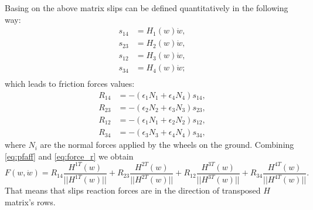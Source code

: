 Basing on the above matrix slips can be defined quantitatively in the following way: 
\begin{align*}
s_{14} &= H_1(w)\dot w,\\
s_{23} &= H_2(w)\dot w,\\
s_{12} &= H_3(w)\dot w,\\
s_{34} &= H_4(w)\dot w;\\
\end{align*}
which leads to friction forces values:
\begin{align}
\label{eq:force_r}
R_{14}&=-(\epsilon_1 N_1 + \epsilon_4 N_4)s_{14},\\
R_{23}&=-(\epsilon_2 N_2 + \epsilon_3 N_3)s_{23},\\
R_{12}&=-(\epsilon_1 N_1 + \epsilon_2 N_2)s_{12},\\
R_{34}&=-(\epsilon_3 N_3 + \epsilon_4 N_4)s_{34},
\end{align}
where $N_i$ are the normal forces applied by the wheels on the ground.
Combining \eqref{eq:pfaff} and \eqref{eq:force_r} we obtain
\begin{equation*}
F(w, \dot{w}) = R_{14}\frac{H^{1T}(w)}{||H^{1T}(w)||} + R_{23}\frac{H^{2T}(w)}{||H^{2T}(w)||} + R_{12}\frac{H^{3T}(w)}{||H^{3T}(w)||} + R_{34}\frac{H^{4T}(w)}{||H^{4T}(w)||}.
\end{equation*}
That means that slips reaction forces are in the direction of transposed $H$ matrix's rows.
